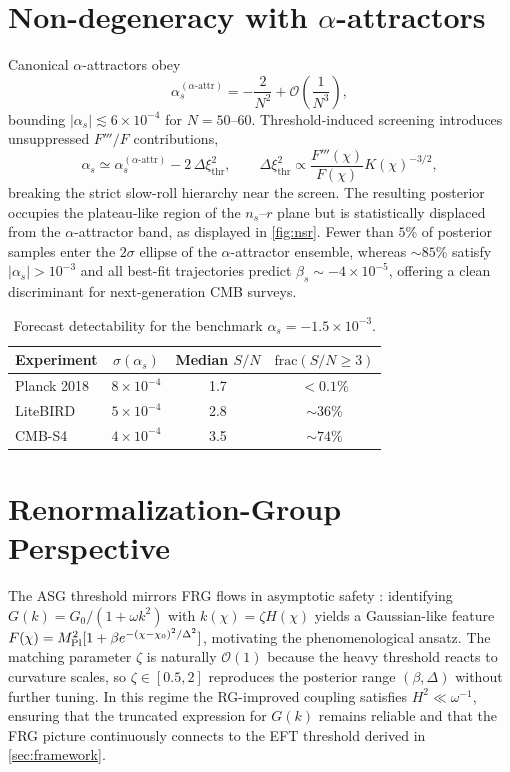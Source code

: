 \documentclass[11pt,a4paper]{article}
\begin{document}
\section{Non-degeneracy with $\alpha$-attractors}
\label{sec:nondegeneracy}
Canonical $\alpha$-attractors obey
\begin{equation}
\alpha_{s}^{(\alpha\text{-attr})}=-\frac{2}{N^{2}}+\mathcal{O}\left(\frac{1}{N^{3}}\right),
\end{equation}
bounding $|\alpha_{s}|\lesssim6\times10^{-4}$ for $N=50$--60. Threshold-induced screening introduces unsuppressed $F'''/F$ contributions,
\begin{equation}
\alpha_{s}\simeq \alpha_{s}^{(\alpha\text{-attr})}-2\,\Delta\xi_{\text{thr}}^{2}, \qquad \Delta\xi_{\text{thr}}^{2}\propto\frac{F'''(\chi)}{F(\chi)}K(\chi)^{-3/2},
\end{equation}
breaking the strict slow-roll hierarchy near the screen. The resulting posterior occupies the plateau-like region of the $n_{s}$--$r$ plane but is statistically displaced from the $\alpha$-attractor band, as displayed in \cref{fig:nsr}. Fewer than $5\%$ of posterior samples enter the $2\sigma$ ellipse of the $\alpha$-attractor ensemble, whereas ${\sim}85\%$ satisfy $|\alpha_{s}|>10^{-3}$ and all best-fit trajectories predict $\beta_{s}\sim -4\times10^{-5}$, offering a clean discriminant for next-generation CMB surveys.

\begin{table}[t]
    \centering
    \caption{Forecast detectability for the benchmark $\alpha_{s}=-1.5\times10^{-3}$.}
    \begin{tabular}{lccc}
        \toprule
        Experiment & $\sigma(\alpha_{s})$ & Median $S/N$ & $\mathrm{frac}(S/N\ge3)$ \\
        \midrule
        Planck 2018 & $8\times10^{-4}$ & 1.7 & $<0.1\%$ \\
        LiteBIRD & $5\times10^{-4}$ & 2.8 & $\sim36\%$ \\
        CMB-S4 & $4\times10^{-4}$ & 3.5 & $\sim74\%$ \\
        \bottomrule
    \end{tabular}
    \label{tab:forecasts}
\end{table}

\section{Renormalization-Group Perspective}
\label{sec:rg}
The ASG threshold mirrors FRG flows in asymptotic safety \cite{Saueressig2023}: identifying $G(k)=G_{0}/(1+\omega k^{2})$ with $k(\chi)=\zeta H(\chi)$ yields a Gaussian-like feature $F(\chi)=M_{\rm Pl}^{2}[1+\beta e^{-(\chi-\chi_{0})^{2}/\Delta^{2}}]$, motivating the phenomenological ansatz. The matching parameter $\zeta$ is naturally $\mathcal{O}(1)$ because the heavy threshold reacts to curvature scales, so $\zeta\in[0.5,2]$ reproduces the posterior range $(\beta,\Delta)$ without further tuning. In this regime the RG-improved coupling satisfies $H^{2}\ll \omega^{-1}$, ensuring that the truncated expression for $G(k)$ remains reliable and that the FRG picture continuously connects to the EFT threshold derived in \cref{sec:framework}.
\end{document}
